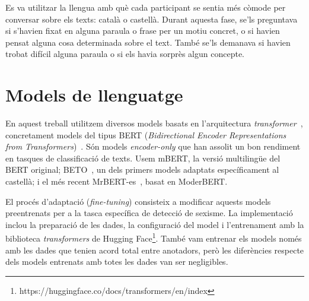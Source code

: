 Es va utilitzar la llengua amb què cada participant se sentia més còmode per conversar sobre els texts: català o castellà.
Durant aquesta fase, se'ls preguntava si s'havien fixat en alguna paraula o frase per un motiu concret, o si havien pensat alguna cosa determinada sobre el text.
També se'ls demanava si havien trobat difícil alguna paraula o si els havia sorprès algun concepte.

\section{Models de llenguatge}


En aquest treball utilitzem diversos models basats en l'arquitectura \textit{transformer}~\cite{vaswaniAttentionAllYou2017}, concretament models del tipus BERT (\textit{Bidirectional Encoder Representations from Transformers})~\cite{devlin2019bert}.
Són models \textit{encoder-only} que han assolit un bon rendiment en tasques de classificació de texts.
Usem mBERT, la versió multilingüe del BERT original; BETO~\cite{canete2023spanish}, un dels primers models adaptats específicament al castellà; i el més recent MrBERT-es~\cite{tamayo2026mrbert}, basat en ModerBERT.

El procés d'adaptació (\textit{fine-tuning}) consisteix a modificar aquests models preentrenats per a la tasca específica de detecció de sexisme.
La implementació inclou la preparació de les dades, la configuració del model i l'entrenament amb la biblioteca \textit{transformers} de Hugging Face\footnote{https://huggingface.co/docs/transformers/en/index}.
També vam entrenar els models només amb les dades que tenien acord total entre anotadors, però les diferències respecte dels models entrenats amb totes les dades van ser negligibles.

%
%

